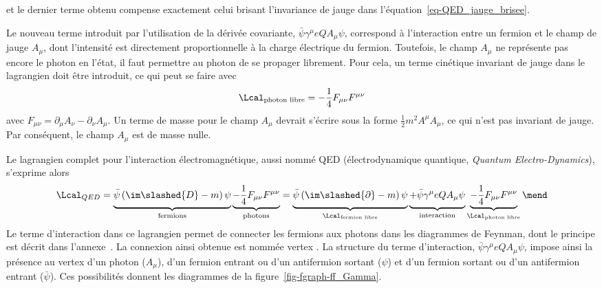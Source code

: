 et le dernier terme obtenu compense exactement celui brisant l'invariance de jauge dans l'équation~\eqref{eq-QED_jauge_brisee}.
\par Le nouveau terme introduit par l'utilisation de la dérivée covariante, $\bar{\psi}\gamma^\mu eQA_\mu \psi$, correspond à l'interaction entre un fermion et le champ de jauge $A_\mu$, dont l'intensité est directement proportionnelle à la charge électrique du fermion.
Toutefois, le champ $A_\mu$ ne représente pas encore le photon en l'état, il faut permettre au photon de se propager librement. Pour cela, un terme cinétique invariant de jauge dans le lagrangien doit être introduit, ce qui peut se faire avec
\begin{equation}
\Lcal_{\text{photon libre}} = - \frac{1}{4} F_{\mu\nu}F^{\mu\nu}
\end{equation}
avec $F_{\mu\nu} = \partial_\mu A_\nu - \partial_\nu A_\mu$.
Un terme de masse pour le champ $A_\mu$ devrait s'écrire sous la forme $\frac{1}{2}m^2A^\mu A_\mu$, ce qui n'est pas invariant de jauge. Par conséquent, le champ $A_\mu$ est de masse nulle.
\par Le lagrangien complet pour l'interaction électromagnétique, aussi nommé QED (électrodynamique quantique, \emph{Quantum Electro-Dynamics}), s'exprime alors
\begin{equation}
\Lcal_{QED}
=
\underbrace{\bar{\psi} \left( \im\slashed{D} - m \right) \psi \vphantom{\frac{1}{4}}}_{\text{fermions}}
\underbrace{- \frac{1}{4} F_{\mu\nu}F^{\mu\nu} \vphantom{\frac{1}{4}}}_{\text{photons}}
=
\underbrace{\bar{\psi} \left( \im\slashed{\partial} - m \right) \psi \vphantom{\frac{1}{4}}}_{\Lcal_{\text{fermion libre}}}
\underbrace{+ \bar{\psi}\gamma^\mu eQA_\mu \psi \vphantom{\frac{1}{4}}}_{\text{interaction}}
\underbrace{- \frac{1}{4} F_{\mu\nu}F^{\mu\nu} \vphantom{\frac{1}{4}}}_{\Lcal_{\text{photon libre}}}
\mend
\end{equation}
Le terme d'interaction dans ce lagrangien permet de \og connecter \fg{} les fermions aux photons dans les diagrammes de Feynman, dont le principe est décrit dans l'annexe~.
La \og connexion \fg{} ainsi obtenue est nommée \og vertex \fg.
La structure du terme d'interaction, $\bar{\psi}\gamma^\mu eQA_\mu \psi$, impose ainsi la présence au vertex d'un photon ($A_\mu$), d'un fermion entrant ou d'un antifermion sortant ($\psi$) et d'un fermion sortant ou d'un antifermion entrant ($\bar{\psi}$). Ces possibilités donnent les diagrammes de la figure~\ref{fig-fgraph-ff_Gamma}.
